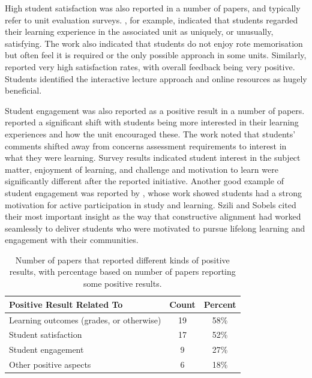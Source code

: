 High student satisfaction was also reported in a number of papers, and typically refer to unit evaluation surveys.  \citet{shepherd2005weaving}, for example, indicated that students regarded their learning experience in the associated unit as uniquely, or unusually, satisfying. The work also indicated that students do not enjoy rote memorisation but often feel it is required or the only possible approach in some units. Similarly, \citet{scott2009promoting} reported very high satisfaction rates, with overall feedback being very positive. Students identified the interactive lecture approach and online resources as hugely beneficial.

Student engagement was also reported as a positive result in a number of papers. \citet{Davey:2002} reported a significant shift with students being more interested in their learning experiences and how the unit encouraged these. The work noted that students' comments shifted away from concerns assessment requirements to interest in what they were learning. Survey results indicated student interest in the subject matter, enjoyment of learning, and challenge and motivation to learn were significantly different after the reported initiative. Another good example of student engagement was reported by \citet{Szili:2011}, whose work showed students had a strong motivation for active participation in study and learning. Szili and Sobels cited their most important insight as the way that constructive alignment had worked seamlessly to deliver students who were motivated to pursue lifelong learning and engagement with their communities.

\begin{table}[p]
	\centering
	\caption{Number of papers that reported different kinds of positive results, with percentage based on number of papers reporting some positive results.}
	\label{tbl:pos_results}
	\footnotesize
    \begin{tabular}{l|c|c}
     \textbf{Positive Result Related To} & \textbf{Count} & \textbf{Percent} \\ \hline
	Learning outcomes (grades, or otherwise)	 & 19 &	58\% \\
	Student satisfaction	 & 17 &	52\% \\
	Student engagement & 	9 &	27\% \\
	Other positive aspects & 	6 &	18\% \\
    \end{tabular}
\end{table}

